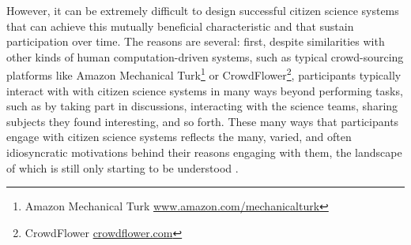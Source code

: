 \documentclass{sigchi}
\begin{document}


However, it can be extremely difficult to design successful citizen science systems that can achieve this mutually beneficial characteristic and that sustain participation over time.  The reasons are several: first, despite similarities with other kinds of human computation-driven systems, such as typical crowd-sourcing platforms like Amazon Mechanical Turk\footnote{Amazon Mechanical Turk \url{www.amazon.com/mechanicalturk}} or CrowdFlower\footnote{CrowdFlower \url{crowdflower.com}}, participants typically interact with with citizen science systems in many ways beyond performing tasks, such as by taking part in discussions, interacting with the science teams, sharing subjects they found interesting, and so forth.  These many ways that participants engage with citizen science systems reflects the many, varied, and often idiosyncratic motivations behind their reasons engaging with them, the landscape of which is still only starting to be understood \cite{raddick2010galaxy}.  %
\end{document}
